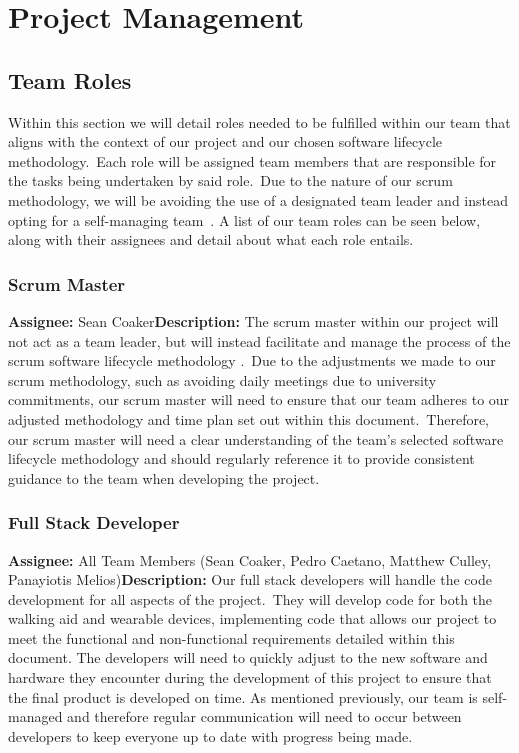 \chapter{Project Management}\label{ch:schedule}

    \section{Team Roles} Within this section we will detail roles needed to be fulfilled within our team that aligns
    with the context of our project and our chosen software lifecycle methodology.\ Each role will be assigned team
    members that are responsible for the tasks being undertaken by said role.\ Due to the nature of our scrum methodology,
    we will be avoiding the use of a designated team leader and instead opting for a self-managing team~\cite{parafianowicz_2019}.
     A list of our team roles can be seen below, along with their assignees and detail about
    what each role entails.

        \subsection{Scrum Master} \textbf{Assignee: } Sean Coaker\newline \textbf{Description: } The scrum master within
        our project will not act as a team leader, but will instead facilitate and manage the process of the scrum
        software lifecycle methodology \cite{bass_2014}.\ Due to the adjustments we made to our scrum methodology, such
        as avoiding daily meetings due to university commitments, our scrum master will need to ensure that our team
        adheres to our adjusted methodology and time plan set out within this document.\ Therefore, our scrum master will
        need a clear understanding of the team's selected software lifecycle methodology and should regularly reference
        it to provide consistent guidance to the team when developing the project.

        \subsection{Full Stack Developer} \textbf{Assignee: } All Team Members (Sean Coaker, Pedro Caetano, Matthew
        Culley, Panayiotis Melios)\newline \textbf{Description: } Our full stack developers will handle the code
        development for all aspects of the project.\ They will develop code for both the walking aid and wearable
        devices, implementing code that allows our project to meet the functional and non-functional requirements
        detailed within this document. The developers will need to quickly adjust to the new software and hardware they
        encounter during the development of this project to ensure that the final product is developed on time. As
        mentioned previously, our team is self-managed and therefore regular communication will need to occur between
        developers to keep everyone up to date with progress being made.

